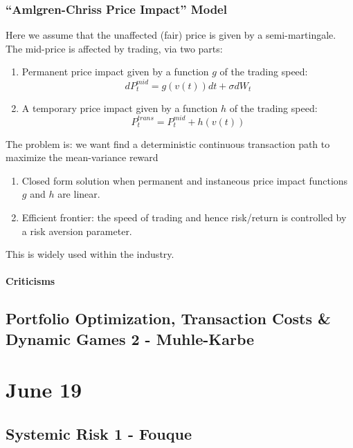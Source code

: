 \documentclass[twocolumn,openany]{book}
\begin{document}
\section{``Amlgren-Chriss Price Impact'' Model}
Here we assume that the unaffected (fair) price is given by a semi-martingale.
The mid-price is affected by trading, via two parts:
\begin{enumerate}
	\item Permanent price impact given by a function $g$ of the trading speed:
	\begin{equation}
		dP_t^{mid} = g(v(t))dt + \sigma dW_t
	\end{equation}
	
	\item A temporary price impact given by a function $h$ of the trading speed:
	\begin{equation}
		P^{trans}_t = P^{mid}_t + h(v(t))
	\end{equation}
\end{enumerate}

The problem is: we want find a deterministic continuous transaction path to maximize the mean-variance reward
\begin{enumerate}
	\item Closed form solution when permanent and instaneous price impact functions $g$ and $h$ are linear.
	\item Efficient frontier: the speed of trading and hence risk/return is controlled by a risk aversion parameter.
\end{enumerate}

This is widely used within the industry.

\subsection{Criticisms}


\chapter{Portfolio Optimization, Transaction Costs \& Dynamic Games 2 - Muhle-Karbe}

\part{June 19}
\chapter{Systemic Risk 1 - Fouque}
\end{document}
